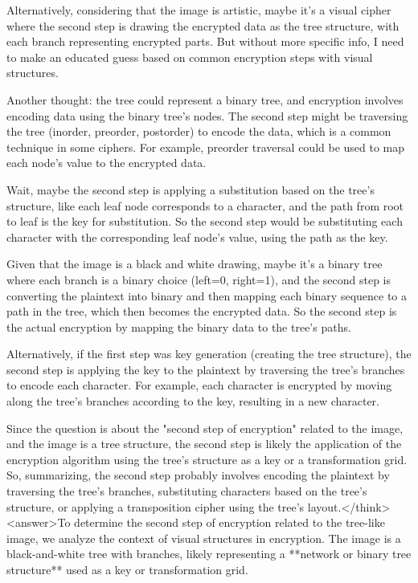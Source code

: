 Alternatively, considering that the image is artistic, maybe it's a visual cipher where the second step is drawing the encrypted data as the tree structure, with each branch representing encrypted parts. But without more specific info, I need to make an educated guess based on common encryption steps with visual structures.

Another thought: the tree could represent a binary tree, and encryption involves encoding data using the binary tree's nodes. The second step might be traversing the tree (inorder, preorder, postorder) to encode the data, which is a common technique in some ciphers. For example, preorder traversal could be used to map each node's value to the encrypted data.

Wait, maybe the second step is applying a substitution based on the tree's structure, like each leaf node corresponds to a character, and the path from root to leaf is the key for substitution. So the second step would be substituting each character with the corresponding leaf node's value, using the path as the key.

Given that the image is a black and white drawing, maybe it's a binary tree where each branch is a binary choice (left=0, right=1), and the second step is converting the plaintext into binary and then mapping each binary sequence to a path in the tree, which then becomes the encrypted data. So the second step is the actual encryption by mapping the binary data to the tree's paths.

Alternatively, if the first step was key generation (creating the tree structure), the second step is applying the key to the plaintext by traversing the tree's branches to encode each character. For example, each character is encrypted by moving along the tree's branches according to the key, resulting in a new character.

Since the question is about the "second step of encryption" related to the image, and the image is a tree structure, the second step is likely the application of the encryption algorithm using the tree's structure as a key or a transformation grid. So, summarizing, the second step probably involves encoding the plaintext by traversing the tree's branches, substituting characters based on the tree's structure, or applying a transposition cipher using the tree's layout.</think><answer>To determine the second step of encryption related to the tree-like image, we analyze the context of visual structures in encryption. The image is a black-and-white tree with branches, likely representing a **network or binary tree structure** used as a key or transformation grid.  

